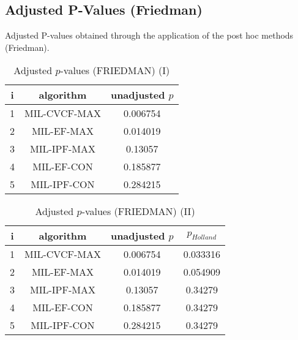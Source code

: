 \documentclass[a4paper,10pt]{article}
\begin{document}
\begin{landscape}
\newpage

\section{Adjusted P-Values (Friedman)}


Adjusted P-values obtained through the application of the post hoc methods (Friedman).

\begin{table}[!htp]
\centering\small
\begin{tabular}{ccc}
i&algorithm&unadjusted $p$\\
\hline1&MIL-CVCF-MAX&0.006754\\2&MIL-EF-MAX&0.014019\\3&MIL-IPF-MAX&0.13057\\4&MIL-EF-CON&0.185877\\5&MIL-IPF-CON&0.284215\\\hline
\end{tabular}
\caption{Adjusted $p$-values (FRIEDMAN) (I)}
\end{table}
\begin{table}[!htp]
\centering\small
\begin{tabular}{cccc}
i&algorithm&unadjusted $p$&$p_{Holland}$\\
\hline1&MIL-CVCF-MAX&0.006754&0.033316\\2&MIL-EF-MAX&0.014019&0.054909\\3&MIL-IPF-MAX&0.13057&0.34279\\4&MIL-EF-CON&0.185877&0.34279\\5&MIL-IPF-CON&0.284215&0.34279\\\hline
\end{tabular}
\caption{Adjusted $p$-values (FRIEDMAN) (II)}
\end{table}

\newpage
\end{landscape}
\end{document}

